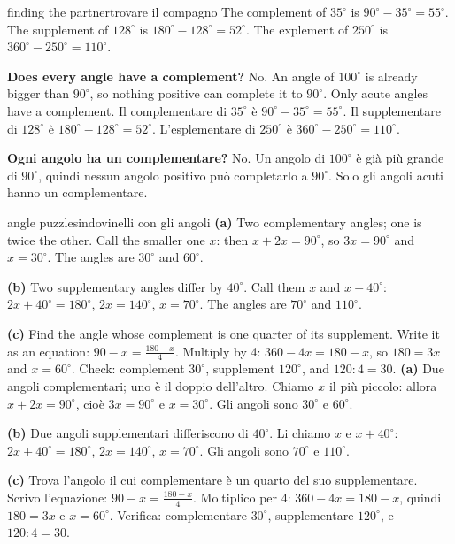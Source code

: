 \begin{example}{finding the partner}{trovare il compagno}
The complement of $35^\circ$ is $90^\circ - 35^\circ = 55^\circ$. The supplement of $128^\circ$ is $180^\circ - 128^\circ = 52^\circ$. The explement of $250^\circ$ is $360^\circ - 250^\circ = 110^\circ$.

\textbf{Does every angle have a complement?} No. An angle of $100^\circ$ is already bigger than $90^\circ$, so nothing positive can complete it to $90^\circ$. Only acute angles have a complement.
\tcblower
Il complementare di $35^\circ$ è $90^\circ - 35^\circ = 55^\circ$. Il supplementare di $128^\circ$ è $180^\circ - 128^\circ = 52^\circ$. L'esplementare di $250^\circ$ è $360^\circ - 250^\circ = 110^\circ$.

\textbf{Ogni angolo ha un complementare?} No. Un angolo di $100^\circ$ è già più grande di $90^\circ$, quindi nessun angolo positivo può completarlo a $90^\circ$. Solo gli angoli acuti hanno un complementare.
\end{example}

\begin{example}{angle puzzles}{indovinelli con gli angoli}
\textbf{(a)} Two complementary angles; one is twice the other. Call the smaller one $x$: then $x + 2x = 90^\circ$, so $3x = 90^\circ$ and $x = 30^\circ$. The angles are $30^\circ$ and $60^\circ$.

\textbf{(b)} Two supplementary angles differ by $40^\circ$. Call them $x$ and $x + 40^\circ$: $2x + 40^\circ = 180^\circ$, $2x = 140^\circ$, $x = 70^\circ$. The angles are $70^\circ$ and $110^\circ$.

\textbf{(c)} Find the angle whose complement is one quarter of its supplement. Write it as an equation: $90 - x = \frac{180 - x}{4}$. Multiply by 4: $360 - 4x = 180 - x$, so $180 = 3x$ and $x = 60^\circ$. Check: complement $30^\circ$, supplement $120^\circ$, and $120 : 4 = 30$.
\tcblower
\textbf{(a)} Due angoli complementari; uno è il doppio dell'altro. Chiamo $x$ il più piccolo: allora $x + 2x = 90^\circ$, cioè $3x = 90^\circ$ e $x = 30^\circ$. Gli angoli sono $30^\circ$ e $60^\circ$.

\textbf{(b)} Due angoli supplementari differiscono di $40^\circ$. Li chiamo $x$ e $x + 40^\circ$: $2x + 40^\circ = 180^\circ$, $2x = 140^\circ$, $x = 70^\circ$. Gli angoli sono $70^\circ$ e $110^\circ$.

\textbf{(c)} Trova l'angolo il cui complementare è un quarto del suo supplementare. Scrivo l'equazione: $90 - x = \frac{180 - x}{4}$. Moltiplico per 4: $360 - 4x = 180 - x$, quindi $180 = 3x$ e $x = 60^\circ$. Verifica: complementare $30^\circ$, supplementare $120^\circ$, e $120 : 4 = 30$.
\end{example}

